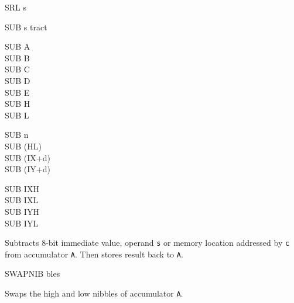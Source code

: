 \begin{basedescript}{
	\desclabelstyle{\multilinelabel}
	\desclabelwidth{3cm}}
\begin{DetailItem}{SRL s}
	\end{DetailItem}

	\pagebreak
	\begin{DetailItem}{SUB s}
		{tract}
		{}

		\begin{DetailVariants}
			SUB A\\
			SUB B\\
			SUB C\\
			SUB D\\
			SUB E\\
			SUB H\\
			SUB L

			\columnbreak
			SUB n\\
			SUB (HL)\\
			SUB (IX+d)\\
			SUB (IY+d)

			\columnbreak
			SUB IXH\UNDOC\\
			SUB IXL\UNDOC\\
			SUB IYH\UNDOC\\
			SUB IYL\UNDOC
		\end{DetailVariants}

		Subtracts 8-bit immediate value, operand {\tt s} or memory location addressed by {\tt c} from accumulator {\tt A}. Then stores result back to {\tt A}.

		\begin{DetailEffects}[v]
			\FlagsSUBr
		\end{DetailEffects}
						
		\begin{DetailTiming}
		\end{DetailTiming}

	\end{DetailItem}

	\begin{DetailItem}{SWAPNIB\ZXN}
		{ bles}
		{\SymSWAPNIB}

		Swaps the high and low nibbles of accumulator {\tt A}.

		\begin{DetailEffects}
			\FlagsSWAPNIB
		\end{DetailEffects}
						
		\begin{DetailTiming}
			\DetailTime{2}{8}
		\end{DetailTiming}


\end{DetailItem}
\end{basedescript}
